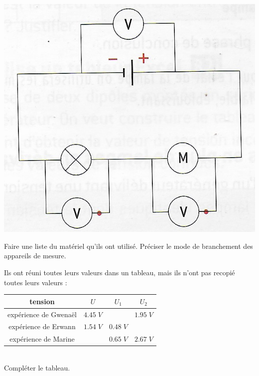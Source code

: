 \documentclass[a4paper,11pt]{exam}
\begin{document}
\begin{center}
	\includegraphics[scale=0.4]{circuit}
\end{center}

\begin{questions}
	\question Faire une liste du matériel qu'ils ont utilisé. Préciser le mode de branchement des appareils de mesure.
	\fillwithdottedlines{3cm}
	
	\question Ils ont réuni toutes leurs valeurs dans un tableau, mais ils n'ont pas recopié toutes leurs valeurs :
	
	\begin{tabular}{|c|c|c|c|}
		\hline
		\textbf{tension}      & $U$            & $U_1$         & $U_2$          \\ \hline
		expérience de Gwenaël & $\num{4.45} \; V$ &               & $\num{1.95} \; V$ \\ \hline
		expérience de Erwann  & $\num{1.54} \; V$ & $\num{0.48} \;V$ &                \\ \hline
		expérience de Marine  &                & $\num{0.65} \; V$ & $\num{2.67} \; V$ \\ \hline
	\end{tabular}

	\ \\
	Compléter le tableau.
\end{questions}
\ \label{LastPage}
\end{document}
